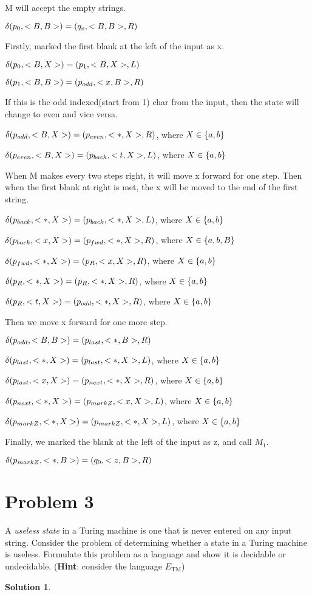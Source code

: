 \documentclass[a4paper,UTF8]{ctexart}
\theoremstyle{definition}
\newtheorem*{solution}{Solution}
\begin{document}
M will accept the empty strings.

$\delta(p_0,<B,B>)=(q_e,<B,B>,R)$

Firstly, marked the first blank at the left of the input as x.

$\delta(p_0,<B,X>)=(p_1,<B,X>,L)$

$\delta(p_1,<B,B>)=(p_{odd},<x,B>,R)$

If this is the odd indexed(start from 1) char from the input, then the state will change to 
even and vice versa.

$\delta(p_{odd},<B,X>)=(p_{even},<*,X>,R)$, where $X \in \{ a,b \}$

$\delta(p_{even},<B,X>)=(p_{back},<t,X>,L)$, where $X \in \{ a,b \}$

When M makes every two steps right, it will move x forward for one step. Then when the 
first blank at right is met, the x will be moved to the end of the first string.

$\delta(p_{back},<*,X>)=(p_{back},<*,X>,L)$, where $X \in \{ a,b \}$

$\delta(p_{back},<x,X>)=(p_{fwd},<*,X>,R)$, where $X \in \{ a,b,B \}$

$\delta(p_{fwd},<*,X>)=(p_R,<x,X>,R)$, where $X \in \{ a,b \}$

$\delta(p_R,<*,X>)=(p_R,<*,X>,R)$, where $X \in \{ a,b \}$

$\delta(p_R,<t,X>)=(p_{odd},<*,X>,R)$, where $X \in \{ a,b \}$

Then we move x forward for one more step.

$\delta(p_{odd},<B,B>)=(p_{last},<*,B>,R)$

$\delta(p_{last},<*,X>)=(p_{last},<*,X>,L)$, where $X \in \{ a,b \}$

$\delta(p_{last},<x,X>)=(p_{next},<*,X>,R)$, where $X \in \{ a,b \}$

$\delta(p_{next},<*,X>)=(p_{markZ},<x,X>,L)$, where $X \in \{ a,b \}$

$\delta(p_{markZ},<*,X>)=(p_{markZ},<*,X>,L)$, where $X \in \{ a,b \}$

Finally, we marked the blank at the left of the input as z, and call $M_1$.

$\delta(p_{markZ},<*,B>)=(q_0,<z,B>,R)$



\section*{Problem 3}
A \textit{useless state} in a Turing machine is one that is never entered on any input string. Consider the problem of determining whether a state in a Turing machine is useless. Formulate this problem as a language and show it is decidable or undecidable. (\textbf{Hint}: consider the language $E_{\mathrm{TM}}$)
\begin{solution}
\end{solution}
\newpage
\end{document}
